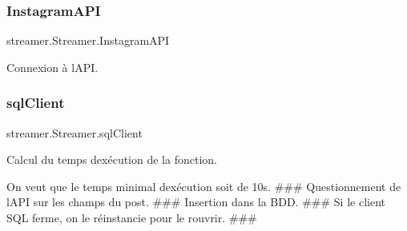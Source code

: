 \subsubsection{\texorpdfstring{Instagram\+A\+PI}{InstagramAPI}}
{\footnotesize\ttfamily streamer.\+Streamer.\+Instagram\+A\+PI}



Connexion à l\textquotesingle{}A\+PI. 

\paragraph*{}\mbox{\label{classstreamer_1_1_streamer_ae7cbab4c93f54faa038805789506e167}} 
\subsubsection{\texorpdfstring{sql\+Client}{sqlClient}}
{\footnotesize\ttfamily streamer.\+Streamer.\+sql\+Client}



Calcul du temps d\textquotesingle{}exécution de la fonction. 

On veut que le temps minimal d\textquotesingle{}exécution soit de 10s. \#\#\# Questionnement de l\textquotesingle{}A\+PI sur les champs du post. \#\#\# Insertion dans la B\+DD. \#\#\# Si le client S\+QL ferme, on le réinstancie pour le rouvrir. \#\#\# 

